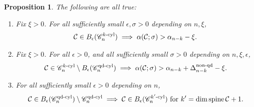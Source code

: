 \documentclass[11pt, letterpaper, reqno]{amsart}
\numberwithin{equation}{section}
\newtheorem{Prop}[Def]{Proposition}
\theoremstyle{remark}
\newcommand{\cC}{\mathcal{C}}
\newcommand{\spine}{\operatorname{spine}}
\begin{document}
\begin{Prop} \label{prop:alpha.sigma.good}
	The following are all true:
	\begin{enumerate}
		\item[(i)] Fix $\xi > 0$. For all sufficiently small $\epsilon, \sigma > 0$ depending on $n, \xi$, 
			\[ \cC \in B_\epsilon(\mathscr{C}_{n}^{k\textnormal{-cyl}}) \implies \alpha(\cC; \sigma) > \alpha_{n - k} - \xi. \]
		\item[(ii)] Fix $\xi > 0$. For all $\epsilon > 0$, and all sufficiently small $\sigma > 0$ depending on $n, \xi, \epsilon$,
			\[ \cC \in \mathscr{C}_{n}^{k\textnormal{-cyl}} \setminus B_\epsilon(\mathscr{C}_n^{\textnormal{qd-cyl}}) \implies \alpha(\cC; \sigma) > \alpha_{n-k} + \Delta_{n-k}^{\textnormal{non-qd}} - \xi. \]
		\item[(iii)] For all sufficiently small $\epsilon > 0$ depending on $n$,
			\[ \cC \in B_\epsilon(\mathscr{C}_n^{\textnormal{qd-cyl}}) \setminus \mathscr{C}_n^{\textnormal{qd-cyl}} \implies \cC \in B_\epsilon(\mathscr{C}_n^{k'\textnormal{-cyl}}) \text{ for } k' = \dim \spine \cC + 1. \]
	\end{enumerate}
\end{Prop}
\end{document}
